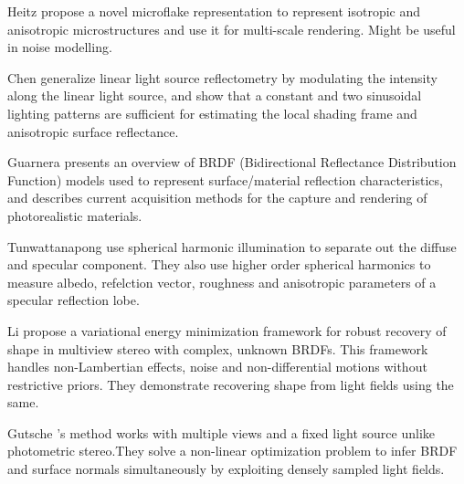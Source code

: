 \dagg Heitz \etal \cite{heitz2015sggx} propose a novel microflake representation to represent isotropic and anisotropic microstructures and use it for multi-scale rendering. Might be useful in noise modelling. 

\dagg Chen \etal \cite{chen2014reflectance} generalize linear light source reflectometry by modulating the intensity along the linear light source, and show that a constant and two sinusoidal lighting patterns are sufficient for estimating the local shading frame and anisotropic surface reflectance. 

\dagg Guarnera \etal \cite{guarnera2016brdf} presents an overview of BRDF (Bidirectional Reflectance Distribution Function) models used to represent surface/material reflection characteristics, and describes current acquisition methods for the capture and rendering of photorealistic materials.

\dagg Tunwattanapong \etal \cite{tunwattanapong2013acquiring} use spherical harmonic illumination to separate out the diffuse and specular component. They also use higher order spherical harmonics to measure albedo, refelction vector, roughness and anisotropic parameters of a specular reflection lobe. 

\dagg Li \etal \cite{li2017robust} propose a variational energy minimization framework for robust recovery of shape in multiview stereo with complex, unknown
BRDFs. This framework handles non-Lambertian effects, noise and non-differential motions without restrictive priors. They demonstrate recovering shape from light fields using the same.

\dagg Gutsche \etal's \cite{gutsche2017surface} method works with multiple views and a fixed light source unlike photometric stereo.They solve a non-linear optimization problem to infer BRDF and surface normals simultaneously by exploiting densely sampled light fields. 
